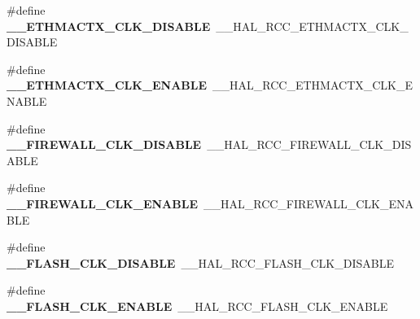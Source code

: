 \begin{DoxyCompactItemize}
\item 
\hypertarget{group___h_a_l___r_c_c___aliased_gaf41b29b7783e35afef15675e4a8fb4a6}{\#define {\bfseries \-\_\-\-\_\-\-E\-T\-H\-M\-A\-C\-T\-X\-\_\-\-C\-L\-K\-\_\-\-D\-I\-S\-A\-B\-L\-E}~\-\_\-\-\_\-\-H\-A\-L\-\_\-\-R\-C\-C\-\_\-\-E\-T\-H\-M\-A\-C\-T\-X\-\_\-\-C\-L\-K\-\_\-\-D\-I\-S\-A\-B\-L\-E}\label{group___h_a_l___r_c_c___aliased_gaf41b29b7783e35afef15675e4a8fb4a6}

\item 
\hypertarget{group___h_a_l___r_c_c___aliased_gacbad4e4827b2926b00956035dc5500ee}{\#define {\bfseries \-\_\-\-\_\-\-E\-T\-H\-M\-A\-C\-T\-X\-\_\-\-C\-L\-K\-\_\-\-E\-N\-A\-B\-L\-E}~\-\_\-\-\_\-\-H\-A\-L\-\_\-\-R\-C\-C\-\_\-\-E\-T\-H\-M\-A\-C\-T\-X\-\_\-\-C\-L\-K\-\_\-\-E\-N\-A\-B\-L\-E}\label{group___h_a_l___r_c_c___aliased_gacbad4e4827b2926b00956035dc5500ee}

\item 
\hypertarget{group___h_a_l___r_c_c___aliased_ga65f5c6169ae96aa7bfda9f5ec6003aa0}{\#define {\bfseries \-\_\-\-\_\-\-F\-I\-R\-E\-W\-A\-L\-L\-\_\-\-C\-L\-K\-\_\-\-D\-I\-S\-A\-B\-L\-E}~\-\_\-\-\_\-\-H\-A\-L\-\_\-\-R\-C\-C\-\_\-\-F\-I\-R\-E\-W\-A\-L\-L\-\_\-\-C\-L\-K\-\_\-\-D\-I\-S\-A\-B\-L\-E}\label{group___h_a_l___r_c_c___aliased_ga65f5c6169ae96aa7bfda9f5ec6003aa0}

\item 
\hypertarget{group___h_a_l___r_c_c___aliased_ga4bc6556711651ce1fd0fa2ba6de66688}{\#define {\bfseries \-\_\-\-\_\-\-F\-I\-R\-E\-W\-A\-L\-L\-\_\-\-C\-L\-K\-\_\-\-E\-N\-A\-B\-L\-E}~\-\_\-\-\_\-\-H\-A\-L\-\_\-\-R\-C\-C\-\_\-\-F\-I\-R\-E\-W\-A\-L\-L\-\_\-\-C\-L\-K\-\_\-\-E\-N\-A\-B\-L\-E}\label{group___h_a_l___r_c_c___aliased_ga4bc6556711651ce1fd0fa2ba6de66688}

\item 
\hypertarget{group___h_a_l___r_c_c___aliased_ga201486d4c60a085aae103a6e24686f79}{\#define {\bfseries \-\_\-\-\_\-\-F\-L\-A\-S\-H\-\_\-\-C\-L\-K\-\_\-\-D\-I\-S\-A\-B\-L\-E}~\-\_\-\-\_\-\-H\-A\-L\-\_\-\-R\-C\-C\-\_\-\-F\-L\-A\-S\-H\-\_\-\-C\-L\-K\-\_\-\-D\-I\-S\-A\-B\-L\-E}\label{group___h_a_l___r_c_c___aliased_ga201486d4c60a085aae103a6e24686f79}

\item 
\hypertarget{group___h_a_l___r_c_c___aliased_gaed751ca0ecff59ac600a0e37bb48595d}{\#define {\bfseries \-\_\-\-\_\-\-F\-L\-A\-S\-H\-\_\-\-C\-L\-K\-\_\-\-E\-N\-A\-B\-L\-E}~\-\_\-\-\_\-\-H\-A\-L\-\_\-\-R\-C\-C\-\_\-\-F\-L\-A\-S\-H\-\_\-\-C\-L\-K\-\_\-\-E\-N\-A\-B\-L\-E}\label{group___h_a_l___r_c_c___aliased_gaed751ca0ecff59ac600a0e37bb48595d}


\end{DoxyCompactItemize}
